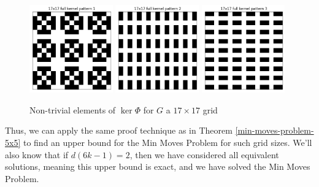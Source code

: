 \documentclass[a4paper]{article}
\begin{document}
	\begin{figure}[H]
		\centering
		\includegraphics[width=0.32\textwidth]{../../code/serialization/kernels/17x17/full/17x17_kernel_full_1.png}
		\includegraphics[width=0.32\textwidth]{../../code/serialization/kernels/17x17/full/17x17_kernel_full_2.png}
		\includegraphics[width=0.32\textwidth]{../../code/serialization/kernels/17x17/full/17x17_kernel_full_3.png}
		\caption{Non-trivial elements of $\ker{\Phi}$ for $G$ a $17 \times 17$ grid}
	\end{figure}
	
	Thus, we can apply the same proof technique as in Theorem \ref{min-moves-problem-5x5} to find an upper bound for the Min Moves Problem for such grid sizes.
	We'll also know that if $d(6k - 1) = 2$, then we have considered all equivalent solutions, meaning this upper bound is exact, and we have solved the Min Moves Problem.
	
\end{document}
